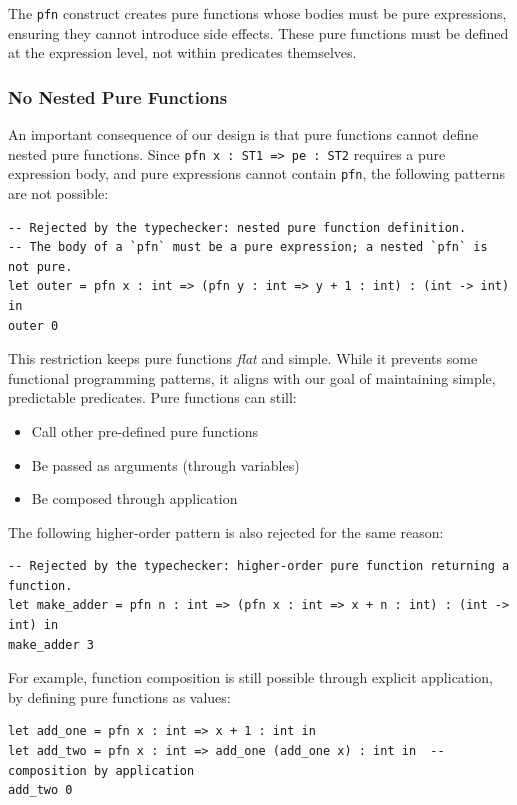 \documentclass[12pt]{article}
\begin{document}
The \texttt{pfn} construct creates pure functions whose bodies must be pure
expressions, ensuring they cannot introduce side effects. These pure functions
must be defined at the expression level, not within predicates themselves.

\subsubsection{No Nested Pure Functions}

An important consequence of our design is that pure functions cannot define nested
pure functions. Since \texttt{pfn x : ST1 => pe : ST2} requires a pure expression body, and
pure expressions cannot contain \texttt{pfn}, the following patterns are not
possible:

\begin{lstlisting}[language=poison]
-- Rejected by the typechecker: nested pure function definition.
-- The body of a `pfn` must be a pure expression; a nested `pfn` is not pure.
let outer = pfn x : int => (pfn y : int => y + 1 : int) : (int -> int) in
outer 0
\end{lstlisting}

This restriction keeps pure functions \emph{flat} and simple. While it prevents
some functional programming patterns, it aligns with our goal of maintaining
simple, predictable predicates. Pure functions can still:
\begin{itemize}
    \item Call other pre-defined pure functions
    \item Be passed as arguments (through variables)
    \item Be composed through application
\end{itemize}

The following higher-order pattern is also rejected for the same reason:

\begin{lstlisting}[language=poison]
-- Rejected by the typechecker: higher-order pure function returning a function.
let make_adder = pfn n : int => (pfn x : int => x + n : int) : (int -> int) in
make_adder 3
\end{lstlisting}

For example, function composition is still possible through explicit application, by defining pure functions as values:
\begin{lstlisting}[language=poison]
let add_one = pfn x : int => x + 1 : int in
let add_two = pfn x : int => add_one (add_one x) : int in  -- composition by application
add_two 0
\end{lstlisting}
\end{document}
